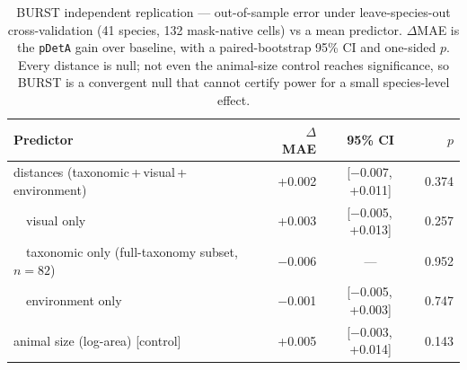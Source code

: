 \begin{table}[htbp]\centering
  \caption[BURST replication]{BURST independent replication --- out-of-sample error under leave-species-out cross-validation
  (41 species, 132 mask-native cells) vs a mean predictor. $\Delta$MAE is the \texttt{pDetA} gain over baseline,
  with a paired-bootstrap 95\% CI and one-sided $p$. Every distance is null; not even the animal-size control
  reaches significance, so BURST is a convergent null that cannot certify power for a small species-level effect.}
  \label{tab:replication_burst}
  \begin{tabular}{lrcr}
    \toprule
    Predictor & $\Delta$MAE & 95\% CI & $p$ \\
    \midrule
    distances (taxonomic\,+\,visual\,+\,environment) & +0.002 & [$-$0.007,\,+0.011] & 0.374 \\
    ~~visual only                                    & +0.003 & [$-$0.005,\,+0.013] & 0.257 \\
    ~~taxonomic only (full-taxonomy subset, $n{=}82$)& $-$0.006 & --- & 0.952 \\
    ~~environment only                               & $-$0.001 & [$-$0.005,\,+0.003] & 0.747 \\
    animal size (log-area) [control]                 & +0.005 & [$-$0.003,\,+0.014] & 0.143 \\
    \bottomrule
  \end{tabular}
\end{table}
